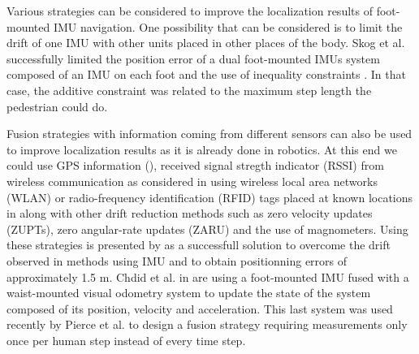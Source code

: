 Various strategies can be considered to improve the localization results of foot-mounted IMU navigation.
One possibility that can be considered is to limit the drift of one IMU with other units placed in other places of the body. Skog et al. successfully limited the position error
of a dual foot-mounted IMUs system composed of an IMU on each foot and the use of inequality constraints \cite{skog2012fusing}. In that case, the additive constraint was related to the maximum step length the pedestrian could do.

Fusion strategies with information coming from different sensors can also be used to improve localization results as it is already done in robotics. 
At this end we could use GPS information (\cite{sukkarieh1999high,hide2012investigating,gao2014data}), received signal stregth indicator (RSSI) from wireless communication as considered
in \cite{malyavej2013indoor} using wireless local area networks (WLAN) or radio-frequency identification (RFID) tags placed at known locations in \cite{ruiz2012accurate}
along with other drift reduction methods such as zero velocity updates (ZUPTs), zero angular-rate updates (ZARU) and the use of magnometers.
Using these strategies is presented by \cite{ruiz2012accurate} as a successfull solution to overcome the drift observed in methods using IMU and to obtain positionning errors of approximately 1.5 m.
Chdid et al. in \cite{chdid2011inertial} are using a foot-mounted IMU fused with a waist-mounted visual odometry system to update the state of the system composed of its position, velocity and acceleration.
This last system was used recently by Pierce et al. \cite{pierce2016incorporation} to design a fusion strategy requiring measurements only once per human step instead of every time step.

